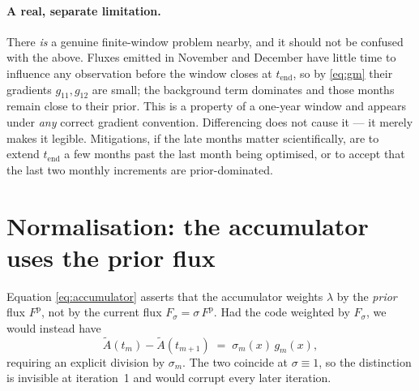 \documentclass[12pt]{article}
\newcommand{\Fprior}{F^{\mathrm{p}}}
\newcommand{\tend}{t_{\mathrm{end}}}
\newcommand{\Adj}{A}
\begin{document}
\paragraph{A real, separate limitation.} There \emph{is} a genuine finite-window
problem nearby, and it should not be confused with the above. Fluxes emitted in
November and December have little time to influence any observation before the
window closes at $\tend$, so by \eqref{eq:gm} their gradients $g_{11}, g_{12}$ are
small; the background term dominates and those months remain close to their prior.
This is a property of a one-year window and appears under \emph{any} correct
gradient convention. Differencing does not cause it --- it merely makes it legible.
Mitigations, if the late months matter scientifically, are to extend $\tend$ a few
months past the last month being optimised, or to accept that the last two monthly
increments are prior-dominated.

\section{Normalisation: the accumulator uses the prior flux}

Equation \eqref{eq:accumulator} asserts that the accumulator weights $\lambda$ by the
\emph{prior} flux $\Fprior$, not by the current flux $F_\sigma = \sigma\,\Fprior$. Had
the code weighted by $F_\sigma$, we would instead have
%
\begin{equation}
  \tilde{\Adj}(t_m) - \tilde{\Adj}(t_{m+1}) \;=\; \sigma_m(x)\, g_m(x),
  \label{eq:norm}
\end{equation}
%
requiring an explicit division by $\sigma_m$. The two coincide at $\sigma \equiv 1$, so
the distinction is invisible at iteration~1 and would corrupt every later iteration.
\end{document}
